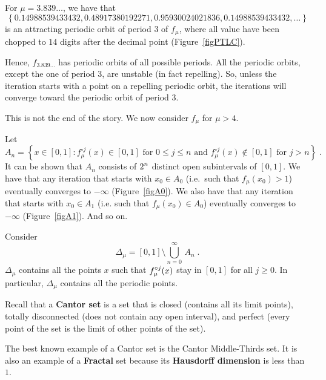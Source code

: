 \begin{egg}
For $\mu = 3.839\ldots$, we have that
\[  
\left\{0.14988539433432, 0.48917380192271, 0.95930024021836,
  0.14988539433432, \ldots \right\}
\]
is an attracting periodic orbit of period $3$ of $f_\mu$, where all
value have been chopped to $14$ digits after the decimal point
(Figure~\ref{figPTLC}).


Hence, $f_{3.839\ldots}$ has periodic orbits of all possible periods.
All the periodic orbits, except the one of period $3$, are unstable
(in fact repelling).  So, unless the iteration starts with a point on
a repelling periodic orbit, the iterations will converge toward the
periodic orbit of period $3$.
\end{egg}

This is not the end of the story.  We now consider $f_\mu$ for
$\mu>4$.

Let
\[
A_n = \left\{ x \in [0,1] : f_\mu^{\circ j}(x) \in [0,1] \text{ for }
0 \leq j \leq n \text{ and } f_\mu^{\circ j}(x) \not\in [0,1] \text{ for }
j > n \right\} \; .
\]
It can be shown that $A_n$ consists of $\displaystyle 2^n$ distinct
open subintervals of $[0,1]$.  We have that any iteration that starts
with $x_0 \in A_0$ (i.e.\ such that $f_\mu(x_0)>1$) eventually
converges to $-\infty$ (Figure~\ref{figA0}).  We also have that any
iteration that starts with $x_0 \in A_1$ (i.e. such that
$f_\mu(x_0) \in A_0$) eventually
converges to $-\infty$ (Figure~\ref{figA1}).  And so on.



Consider
\[
\Delta_\mu = [0,1] \setminus \bigcup_{n=0}^\infty \,A_n \; .
\]
$\Delta_\mu$ contains all the points $x$ such that
$\displaystyle f_\mu^{\circ j}(x)$ stay
in $[0,1]$ for all $j\geq 0$.  In particular, $\Delta_\mu$ contains all
the periodic points.

Recall that a {\bfseries Cantor set} is a set that
is closed (contains
all its limit points), totally disconnected (does not contain any open
interval), and perfect (every point of the set is the limit of other
points of the set).

\begin{egg}
The best known example of a Cantor set is the Cantor Middle-Thirds
set.  It is also an example of a
{\bfseries Fractal} set because its
{\bfseries Hausdorff dimension} is less than \(1\).
\end{egg}

